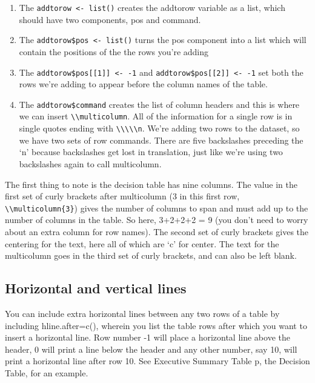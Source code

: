 \documentclass[12pt,]{article}
\providecommand{\tightlist}{%
  \setlength{\itemsep}{0pt}\setlength{\parskip}{0pt}}
\begin{document}
\begin{enumerate}
\def\labelenumi{\arabic{enumi}.}
\tightlist
\item
  The \verb|addtorow <- list()| creates the addtorow variable as a list,
  which should have two components, pos and command.
\item
  The \verb|addtorow$pos <- list()| turns the pos component into a list
  which will contain the positions of the the rows you're adding
\item
  The \verb|addtorow$pos[[1]] <- -1| and \verb|addtorow$pos[[2]] <- -1|
  set both the rows we're adding to appear before the column names of
  the table.
\item
  The \verb|addtorow$command| creates the list of column headers and
  this is where we can insert \verb|\\multicolumn|. All of the
  information for a single row is in single quotes ending with
  \verb|\\\\\n|. We're adding two rows to the dataset, so we have two
  sets of row commands. There are five backslashes preceding the `n'
  because backslashes get lost in translation, just like we're using two
  backslashes again to call multicolumn.
\end{enumerate}

The first thing to note is the decision table has nine columns. The
value in the first set of curly brackets after multicolumn (3 in this
first row, \verb|\\multicolumn{3}|) gives the number of columns to span
and must add up to the number of columns in the table. So here, 3+2+2+2
= 9 (you don't need to worry about an extra column for row names). The
second set of curly brackets gives the centering for the text, here all
of which are `c' for center. The text for the multicolumn goes in the
third set of curly brackets, and can also be left blank.

\subsection{Horizontal and vertical
lines}\label{horizontal-and-vertical-lines}

You can include extra horizontal lines between any two rows of a table
by including hline.after=c(), wherein you list the table rows after
which you want to insert a horizontal line. Row number -1 will place a
horizontal line above the header, 0 will print a line below the header
and any other number, say 10, will print a horizontal line after row 10.
See Executive Summary Table p, the Decision Table, for an example.
\end{document}
